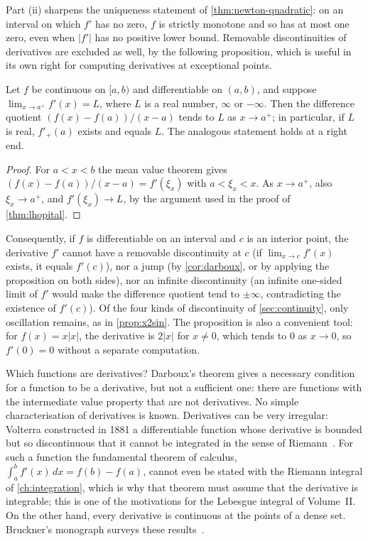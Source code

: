 Part (ii) sharpens the uniqueness statement of \cref{thm:newton-quadratic}: on an interval on which $f'$ has no zero, $f$ is strictly monotone and so has at most one zero, even when $|f'|$ has no positive lower bound. Removable discontinuities of derivatives are excluded as well, by the following proposition, which is useful in its own right for computing derivatives at exceptional points.

\begin{proposition}
\label{prop:derivative-limit}
Let $f$ be continuous on $[a,b)$ and differentiable on $(a,b)$, and suppose $\lim_{x\to a^+}f'(x)=L$, where $L$ is a real number, $\infty$ or $-\infty$. Then the difference quotient $(f(x)-f(a))/(x-a)$ tends to $L$ as $x\to a^+$; in particular, if $L$ is real, $f'_+(a)$ exists and equals $L$. The analogous statement holds at a right end.
\end{proposition}

\begin{proof}
For $a<x<b$ the mean value theorem gives $(f(x)-f(a))/(x-a)=f'(\xi_x)$ with $a<\xi_x<x$. As $x\to a^+$, also $\xi_x\to a^+$, and $f'(\xi_x)\to L$, by the argument used in the proof of \cref{thm:lhopital}.
\end{proof}

Consequently, if $f$ is differentiable on an interval and $c$ is an interior point, the derivative $f'$ cannot have a removable discontinuity at $c$ (if $\lim_{x\to c}f'(x)$ exists, it equals $f'(c)$), nor a jump (by \cref{cor:darboux}, or by applying the proposition on both sides), nor an infinite discontinuity (an infinite one-sided limit of $f'$ would make the difference quotient tend to $\pm\infty$, contradicting the existence of $f'(c)$). Of the four kinds of discontinuity of \cref{sec:continuity}, only oscillation remains, as in \cref{prop:x2sin}. The proposition is also a convenient tool: for $f(x)=x|x|$, the derivative is $2|x|$ for $x\ne0$, which tends to $0$ as $x\to0$, so $f'(0)=0$ without a separate computation.

\begin{note}{Which functions are derivatives?}
Darboux's theorem gives a necessary condition for a function to be a derivative, but not a sufficient one: there are functions with the intermediate value property that are not derivatives. No simple characterisation of derivatives is known. Derivatives can be very irregular: Volterra constructed in 1881 a differentiable function whose derivative is bounded but so discontinuous that it cannot be integrated in the sense of Riemann~\cite{volterra1881}. For such a function the fundamental theorem of calculus, $\int_a^bf'(x)\,dx=f(b)-f(a)$, cannot even be stated with the Riemann integral of \cref{ch:integration}, which is why that theorem must assume that the derivative is integrable; this is one of the motivations for the Lebesgue integral of Volume~II. On the other hand, every derivative is continuous at the points of a dense set. Bruckner's monograph surveys these results~\cite{bruckner1994}.
\end{note}

